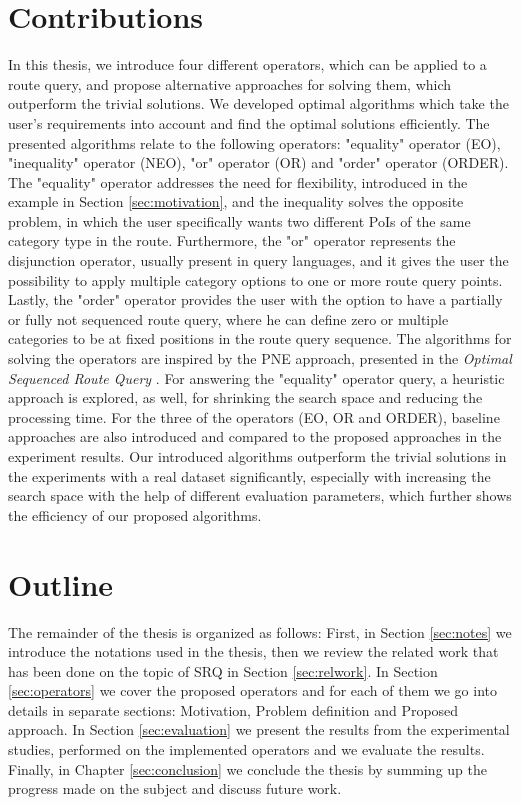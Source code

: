 \section{Contributions}
In this thesis, we introduce four different operators, which can be applied to a route query, and propose alternative approaches for solving them, which outperform the trivial solutions. We developed optimal algorithms which take the user's requirements into account and find the optimal solutions efficiently. The presented algorithms relate to the following operators: "equality" operator (EO), "inequality" operator (NEO), "or" operator (OR) and "order" operator (ORDER). The "equality" operator addresses the need for flexibility, introduced in the example in Section \ref{sec:motivation}, and the inequality solves the opposite problem, in which the user specifically wants two different PoIs of the same category type in the route. Furthermore, the "or" operator represents the disjunction operator, usually present in query languages, and it gives the user the possibility to apply multiple category options to one or more route query points. Lastly, the "order" operator provides the user with the option to have a partially or fully not sequenced route query, where he can define zero or multiple categories to be at fixed positions in the route query sequence. \newline
The algorithms for solving the operators are inspired by the PNE approach, presented in the \textit{Optimal Sequenced Route Query} \cite{OSR}. For answering the "equality" operator query, a heuristic approach is explored, as well, for shrinking the search space and reducing the processing time. For the three of the operators (EO, OR and ORDER), baseline approaches are also introduced and compared to the proposed approaches in the experiment results. Our introduced algorithms outperform the trivial solutions in the experiments with a real dataset significantly, especially with increasing the search space with the help of different evaluation parameters, which further shows the efficiency of our proposed algorithms.

\section{Outline}
The remainder of the thesis is organized as follows: First, in Section \ref{sec:notes} we introduce the notations used in the thesis, then we review the related work that has been done on the topic of SRQ in Section \ref{sec:relwork}. In Section \ref{sec:operators} we cover the proposed operators and for each of them we go into details in separate sections: Motivation, Problem definition and Proposed approach. In Section \ref{sec:evaluation} we present the results from the experimental studies, performed on the implemented operators and we evaluate the results. Finally, in Chapter \ref{sec:conclusion} we conclude the thesis by summing up the progress made on the subject and discuss future work.